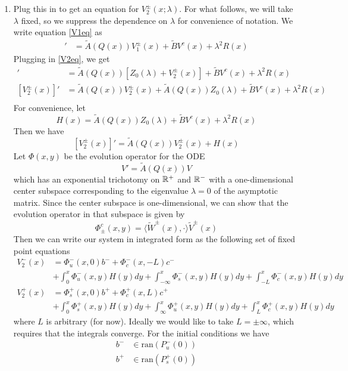 \documentclass[thesis.tex]{subfiles}
\begin{document}
\begin{enumerate}
\item Plug this in to get an equation for $V_2^\pm(x; \lambda)$. For what follows, we will take $\lambda$ fixed, so we suppress the dependence on $\lambda$ for convenience of notation. We write equation \eqref{V1eq} as
\begin{align*}
[V_1^\pm(x)]' &= \tilde{A}(Q(x)) V_1^\pm(x) + \tilde{B} V^c(x) + \lambda^2 R(x)
\end{align*}
Plugging in \eqref{V2eq}, we get
\begin{align*}
[Z_0(\lambda) + V_2^\pm(x)]' &= \tilde{A}(Q(x)) [Z_0(\lambda) + V_2^\pm(x)] + \tilde{B} V^c(x) + \lambda^2 R(x) \\
[V_2^\pm(x)]' &= \tilde{A}(Q(x)) V_2^\pm(x) + \tilde{A}(Q(x)) Z_0(\lambda) + \tilde{B} V^c(x) + \lambda^2 R(x) \\
\end{align*}
For convenience, let
\[
H(x) = \tilde{A}(Q(x)) Z_0(\lambda) + \tilde{B} V^c(x) + \lambda^2 R(x)
\]
Then we have
\[
[V_2^\pm(x)]' = \tilde{A}(Q(x)) V_2^\pm(x) + H(x)
\]
Let $\Phi(x,y)$ be the evolution operator for the ODE
\[
V' = \tilde{A}(Q(x))V
\]
which has an exponential trichotomy on ${\mathbb R}^+$ and ${\mathbb R}^-$ with a one-dimensional center subspace corresponding to the eigenvalue $\lambda = 0$ of the asymptotic matrix. Since the center subspace is one-dimensional, we can show that the evolution operator in that subspace is given by
\[
\Phi^c_\pm(x,y) = \langle \tilde{W}^\pm(x), \cdot \rangle \tilde{V}^\pm(x)
\]
Then we can write our system in integrated form as the following set of fixed point equations
\begin{equation*}
\begin{aligned}
V_2^-(x) &= \Phi_u^-(x, 0) b^- + \Phi_c^-(x, -L) c^- \\
&+ \int_0^x \Phi_u^-(x, y) H(y) dy + \int_{-\infty}^x \Phi_s^-(x, y) H(y) dy + \int_{-L}^x \Phi_c^-(x, y) H(y) dy \\ 
V_2^+(x) &= \Phi_s^+(x, 0) b^+ + \Phi_c^+(x, L)c^+ \\
&+ \int_0^x \Phi_s^+(x, y)H(y) dy
+ \int_{\infty}^x \Phi_u^+(x, y)H(y) dy + \int_{L}^x \Phi_c^+(x, y) H(y) dy
\end{aligned}
\end{equation*}
where $L$ is arbitrary (for now). Ideally we would like to take $L = \pm \infty$, which requires that the integrals converge. For the initial conditions we have
\begin{align*}
b^- &\in \text{ran}(P_u^-(0)) \\
b^+ &\in \text{ran}(P_s^+(0)) \\

\end{align*}
\end{enumerate}
\end{document}
